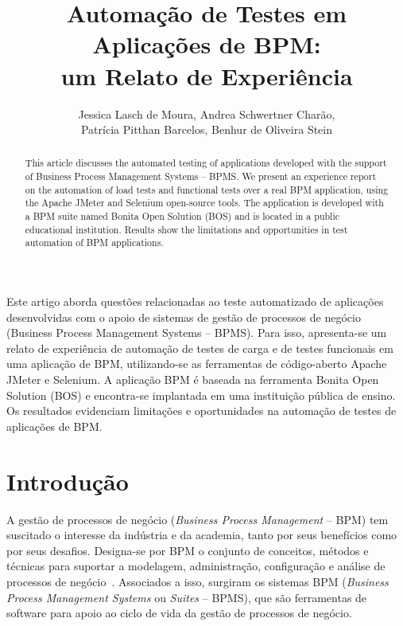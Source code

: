 \documentclass[12pt]{article}
\title{Automação de Testes em Aplicações de BPM:\\ um Relato de Experiência}
\author{Jessica Lasch de Moura\inst{1},
Andrea Schwertner Charão\inst{1},\\ Patrícia Pitthan Barcelos\inst{1}, Benhur de Oliveira Stein\inst{1}}
\begin{document}
\maketitle




\begin{resumo}
Este artigo aborda questões relacionadas ao teste automatizado de aplicações desenvolvidas com o apoio de sistemas de gestão de processos de negócio (Business Process Management Systems -- BPMS). Para isso, apresenta-se um relato de experiência de automação de testes de carga e de testes funcionais em uma aplicação de BPM, utilizando-se as ferramentas de código-aberto Apache JMeter e Selenium. A aplicação BPM é baseada na ferramenta Bonita Open Solution (BOS) e encontra-se implantada em uma instituição pública de ensino. Os resultados evidenciam limitações e oportunidades na automação de testes de aplicações de BPM.
\end{resumo}




\begin{abstract}
This article discusses the automated testing of applications developed with the support of Business Process Management Systems -- BPMS. We present an experience report on the automation of load tests and functional tests over a real BPM application, using the Apache JMeter and Selenium open-source tools. The application is developed with a BPM suite named Bonita Open Solution (BOS) and is located in a public educational institution. Results show the limitations and opportunities in test automation of BPM applications.
\end{abstract}




\section{Introdução}
A gestão de processos de negócio (\emph{Business Process Management} -- BPM) tem suscitado o interesse da indústria e da academia, tanto por seus benefícios como por seus desafios. Designa-se por BPM o conjunto de conceitos, métodos e técnicas para suportar a modelagem, administração, configuração e análise de processos de negócio~\cite{weske}. Associados a isso, surgiram os sistemas BPM (\emph{Business Process Management Systems} ou \emph{Suites} -- BPMS), que são ferramentas de software para apoio ao ciclo de vida da gestão de processos de negócio. 
\end{document}
